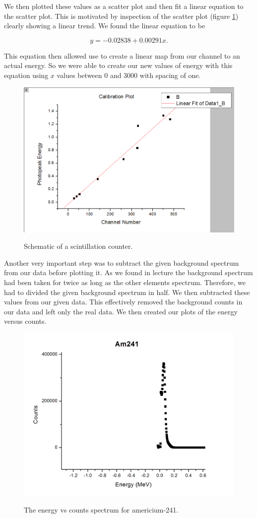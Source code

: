 \documentclass[12pt letterpaper]{article}
\begin{document}
We then plotted these values as a scatter plot and then fit a linear equation to the scatter plot. This is motivated by inspection of the scatter plot (figure \ref{fig:calibration}) clearly showing a linear trend. We found the linear equation to be 

\begin{equation}
y = -0.02838 + 0.00291 x.
\end{equation}

This equation then allowed use to create a linear map from our channel to an actual energy. So we were able to create our new values of energy with this equation using $x$ values between 0 and 3000 with spacing of one. 

\begin{figure}[H]
  \caption{Schematic of a scintillation counter.}
  \centering
    \includegraphics[width=.60\textwidth]{calibration_plot.png}
    \label{fig:calibration}
\end{figure}

Another very important step was to subtract the given background spectrum from our data before plotting it. As we found in lecture the background spectrum had been taken for twice as long as the other elements spectrum. Therefore, we had to divided the given background spectrum in half. We then subtracted these values from our given data. This effectively removed the background counts in our data and left only the real data. We then created our plots of the energy versus counts. 

\begin{figure}[H]
  \caption{The energy vs counts spectrum for americium-241.}
  \centering
    \includegraphics[width=.60\textwidth]{am241.JPG}
    \label{fig:am241}
\end{figure}
\end{document}
